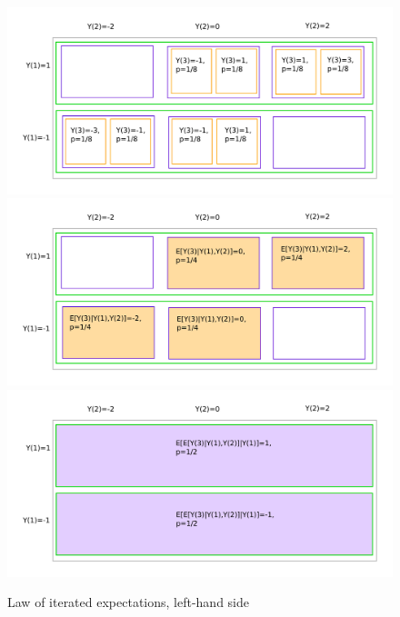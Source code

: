 \documentclass[12pt,reqno,openany]{amsbook}
\theoremstyle{plain}
\theoremstyle{definition}
\begin{document}
\begin{figure}
\includegraphics[width=\textwidth]{iter_expect/lie1.pdf}\\
\includegraphics[width=\textwidth]{iter_expect/lie2.pdf}\\
\includegraphics[width=\textwidth]{iter_expect/lie3.pdf}
\caption{Law of iterated expectations, left-hand side}\label{fig:lie-lhs}
\end{figure}
\end{document}
